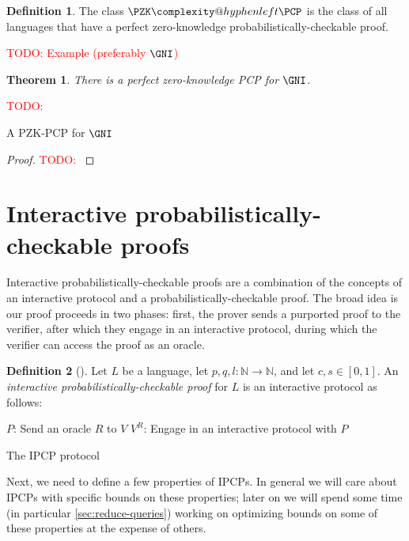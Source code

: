 \documentclass[english,12pt]{reedthesis}
\makeatletter
\theoremstyle{plain}
\newtheorem{thm}{Theorem}[section]
\theoremstyle{definition}
\newtheorem{defn}[defn]{Definition}
\theoremstyle{remark}
\newcommand{\PZKPCP}{%
  \PZK\complexity@hyphenleft\PCP
}
\newcommand{\TODO}[1]{\textcolor{red}{TODO: #1}}
\makeatother
\begin{document}
\begin{defn}\label{def:pzkpcp-class}\index{PZK-PCP@$\PZKPCP$}
  The class $\PZKPCP$ is the class of all languages that have a perfect
  zero-knowledge probabilistically-checkable proof.
\end{defn}

\TODO{Example (preferably $\GNI$)}

\begin{thm}\label{thm:gni-pzkpcp}
  There is a perfect zero-knowledge PCP for $\GNI$.
\end{thm}

\begin{algorithm}[htbp]
  \TODO{}
  \caption{A PZK-PCP for $\GNI$}\label{alg:gni-pzkpcp}
\end{algorithm}

\begin{proof}
  \TODO{}
\end{proof}

\section{Interactive probabilistically-checkable proofs}\label{sec:ipcp}

Interactive probabilistically-checkable proofs are a combination of the concepts
of an interactive protocol and a probabilistically-checkable proof. The broad
idea is our proof proceeds in two phases: first, the prover sends a purported
proof to the verifier, after which they engage in an interactive protocol,
during which the verifier can access the proof as an oracle.

\begin{defn}[{\cite[]{KR08}}]\label{def:ipcp}
  Let $L$ be a language, let $p, q, l\colon \mathbb{N} \rightarrow \mathbb{N}$, and let $c, s \in [0, 1]$. An
  \emph{interactive probabilistically-checkable proof} for $L$ is an interactive
  protocol as follows:

  \begin{algorithm}[H]
    $P$: Send an oracle $R$ to $V$\;
    $V^{R}$: Engage in an interactive protocol with $P$\;
    \caption{The IPCP protocol}\label{alg:ipcp-protocol}
  \end{algorithm}
\end{defn}

Next, we need to define a few properties of IPCPs. In general we will care about
IPCPs with specific bounds on these properties; later on we will spend some time
(in particular \cref{sec:reduce-queries}) working on optimizing bounds on some
of these properties at the expense of others.
\end{document}
